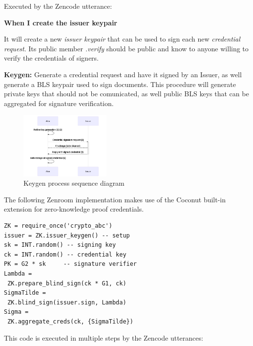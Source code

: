 \documentclass[twocolumn]{article}
\begin{document}
Executed by the Zencode utterance:

\textbf{When I create the issuer keypair}

It will create a new \emph{issuer keypair} that can be used to sign
each new \emph{credential request}. Its public member \emph{.verify}
should be public and know to anyone willing to verify the credentials
of signers.

\textbf{Keygen:} Generate a credential request and have it signed by
an Issuer, as well generate a BLS keypair used to sign documents. This
procedure will generate private keys that should not be comunicated,
as well public BLS keys that can be aggregated for signature
verification.

\begin{figure}
  \caption{Keygen process sequence diagram}
  \centering
  \includegraphics[width=0.4\textwidth]{keygen-seq}
\end{figure}

The following Zenroom implementation makes use of the Coconut
built-in extension for zero-knowledge proof credentials.

\begin{lstlisting}[basicstyle=\tiny,style=lua]
ZK = require_once('crypto_abc')
issuer = ZK.issuer_keygen() -- setup
sk = INT.random() -- signing key
ck = INT.random() -- credential key
PK = G2 * sk     -- signature verifier
Lambda =
 ZK.prepare_blind_sign(ck * G1, ck)
SigmaTilde =
 ZK.blind_sign(issuer.sign, Lambda)
Sigma =
 ZK.aggregate_creds(ck, {SigmaTilde})
\end{lstlisting}

This code is executed in multiple steps by the Zencode utterances:
\end{document}
